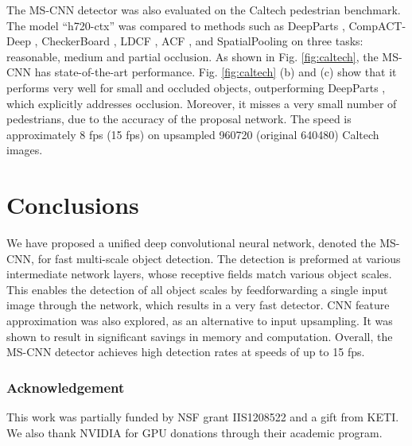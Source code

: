 \documentclass[runningheads]{llncs}
\begin{document}
The MS-CNN detector was also evaluated on the Caltech pedestrian benchmark. The  model ``h720-ctx'' was compared to methods such as
DeepParts \cite{DBLP:conf/iccv/TianLWT15},
CompACT-Deep \cite{DBLP:conf/iccv/CaiSV15},
CheckerBoard \cite{DBLP:conf/cvpr/ZhangBS15},
LDCF \cite{DBLP:conf/nips/NamDH14}, ACF \cite{DBLP:journals/pami/DollarABP14},
and SpatialPooling \cite{DBLP:journals/corr/PaisitkriangkraiSH14b} on
three tasks: reasonable, medium and partial occlusion. As shown in
Fig. \ref{fig:caltech}, the MS-CNN has state-of-the-art performance.
Fig. \ref{fig:caltech} (b) and (c) show that it performs very well for small
and occluded objects, outperforming DeepParts \cite{DBLP:conf/iccv/TianLWT15},
which explicitly addresses occlusion. Moreover, it misses a very small
number of pedestrians, due to the accuracy of the proposal network.
The speed is approximately 8 fps (15 fps) on upsampled
960720 (original 640480) Caltech images.


\section{Conclusions}

We have proposed a unified deep convolutional neural network, denoted the
MS-CNN, for fast multi-scale object detection. The detection is preformed at various intermediate network layers, whose receptive fields match
various object scales. This enables the detection of all object scales
by feedforwarding a single input image through the network,
which results in a very fast detector. CNN feature approximation was also
explored, as an alternative to input upsampling. It was shown to
result in significant savings in memory and computation. Overall,
the MS-CNN detector achieves high detection rates at speeds of up to 15 fps.

\subsubsection{Acknowledgement}
This work was partially funded by NSF grant IIS1208522 and a gift from KETI. We also thank NVIDIA for GPU donations through their academic program.

\clearpage



\end{document}
